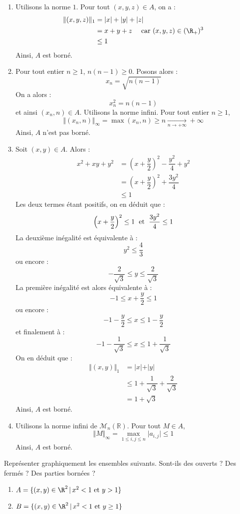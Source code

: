 \documentclass[a4paper,10pt]{report}
\begin{document}
\corr 
\begin{enumerate}
\item Utilisons la norme $1$. Pour tout $(x,y,z) \in A$, on a :
\begin{align*}
\Vert (x,y,z) \Vert_1 & = \vert x \vert + \vert y \vert + \vert z \vert \\
& = x+y+z \quad \hbox{ car } (x,y,z) \in  (\R_+)^3 \\
&  \leq 1
\end{align*}
Ainsi, $A$ est borné.
\item Pour tout entier $n \geq 1$, $ n(n-1) \geq 0$. Posons alors :
$$ x_n = \sqrt{n(n-1)}$$
On a alors :
$$ x_n^2= n(n-1)$$
et ainsi $(x_n,n) \in A$. Utilisons la norme infini. Pour tout entier $n \geq 1$,
$$ \Vert (x_n,n) \Vert_{\infty} = \max(x_n,n) \geq n \underset{n \rightarrow + \infty}{\longrightarrow} + \infty$$
Ainsi, $A$ n'est pas borné.
\item Soit $(x,y) \in A$. Alors :
\begin{align*}
x^2+xy+y^2 & = \left( x+\dfrac{y}{2}  \right)^2 - \dfrac{y^2}{4}+ y^2 \\
& = \left( x+\dfrac{y}{2}  \right)^2  + \dfrac{3y^2}{4} \\
& \leq 1
\end{align*}
Les deux termes étant positifs, on en déduit que :
$$ \left( x+\dfrac{y}{2}  \right)^2 \leq 1 \; \hbox{ et } \; \dfrac{3y^2}{4} \leq 1 $$
La deuxième inégalité est équivalente à :
$$ y^2 \leq \dfrac{4}{3}$$
ou encore :
$$ - \dfrac{2}{\sqrt{3}} \leq y \leq \dfrac{2}{\sqrt{3}}$$
La première inégalité est alors équivalente à :
$$ -1 \leq x+\dfrac{y}{2} \leq 1 $$
ou encore :
$$ -1 - \dfrac{y}{2} \leq x \leq 1- \dfrac{y}{2}$$
et finalement à :
$$ -1 - \dfrac{1}{\sqrt{3}} \leq x \leq 1 + \dfrac{1}{\sqrt{3}}$$
On en déduit que :
\begin{align*}
\Vert (x,y) \Vert_1 & = \vert x \vert + \vert y \vert \\
& \leq 1+ \dfrac{1}{\sqrt{3}} + \dfrac{2}{\sqrt{3}} \\
& = 1 + \sqrt{3}
\end{align*}
Ainsi, $A$ est borné.
\item Utilisons la norme infini de $\mathcal{M}_n(\mathbb{R})$. Pour tout $M \in A$,
$$ \Vert M \Vert_{\infty} = \max_{1 \leq i,j \leq n} \vert a_{i,j} \vert  \leq 1$$
Ainsi, $A$ est borné.
\end{enumerate}

\begin{Exa} Repr\'esenter graphiquement les ensembles suivants. Sont-ils des ouverts ? Des ferm\'es ? Des parties bornées ?
\begin{enumerate}
\item $A = \lbrace (x,y)\in\R^2 \, \vert \, x^2 < 1 \hbox{ et } y> 1\rbrace$
\item $B = \lbrace (x,y)\in\R^2 \, \vert \, x^2 < 1 \hbox{ et } y \geq 1\rbrace$
\end{enumerate}
\end{Exa}
\end{document}
